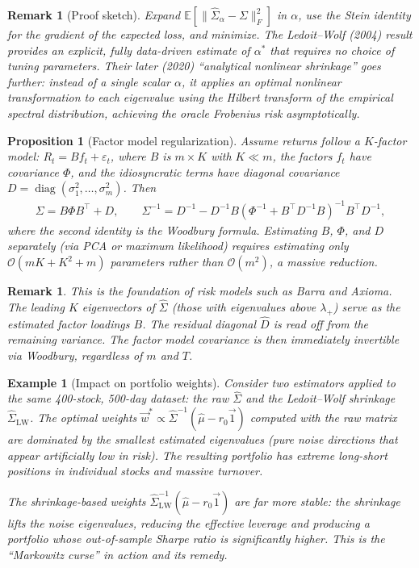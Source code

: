 \documentclass{report}
\theoremstyle{spacedplain}
\newtheorem{proposition}[theorem]{Proposition}
\theoremstyle{spaceddefinition}
\newtheorem{example}[theorem]{Example}
\theoremstyle{spacedremark}
\newtheorem{remark}[theorem]{Remark}
\begin{document}
\begin{remark}[Proof sketch]
Expand $\mathbb{E}[\|\hat{\Sigma}_\alpha - \Sigma\|_F^2]$ in $\alpha$, use the Stein identity for the gradient of the expected loss, and minimize. The Ledoit--Wolf (2004) result provides an explicit, fully data-driven estimate of
$\alpha^*$ that requires no choice of tuning parameters. Their later (2020) ``analytical nonlinear shrinkage'' goes further: instead of a single scalar $\alpha$, it applies an optimal nonlinear transformation to each eigenvalue
using the Hilbert transform of the empirical spectral distribution, achieving the oracle Frobenius risk asymptotically.
\end{remark}
 
\begin{proposition}[Factor model regularization]
Assume returns follow a $K$-factor model: $R_t = Bf_t + \varepsilon_t$, where $B$ is $m\times K$ with $K \ll m$, the factors $f_t$ have covariance $\Phi$, and the idiosyncratic terms have diagonal covariance $D = \operatorname{diag}(\sigma_1^2,\ldots,\sigma_m^2)$. Then
\begin{align}
    \Sigma = B\Phi B^\top + D,
    \qquad
    \Sigma^{-1} = D^{-1} - D^{-1}B(\Phi^{-1} + B^\top D^{-1}B)^{-1}B^\top D^{-1},
\end{align}
where the second identity is the Woodbury formula. Estimating $B$, $\Phi$, and $D$ separately (via PCA or maximum likelihood) requires estimating only $\mathcal{O}(mK + K^2 + m)$ parameters rather than $\mathcal{O}(m^2)$, a massive reduction.
\end{proposition}
 
\begin{remark}
This is the foundation of risk models such as Barra and Axioma. The leading $K$ eigenvectors of $\hat{\Sigma}$ (those with eigenvalues above $\lambda_+$) serve as the estimated factor loadings $B$. The residual diagonal $\hat{D}$ is read
off from the remaining variance. The factor model covariance is then immediately invertible via Woodbury, regardless of $m$ and $T$.
\end{remark}
 
\begin{example}[Impact on portfolio weights]
Consider two estimators applied to the same 400-stock, 500-day dataset: the raw $\hat{\Sigma}$ and the Ledoit--Wolf shrinkage $\hat{\Sigma}_{\mathrm{LW}}$. The optimal weights $\vec{w}^* \propto \hat{\Sigma}^{-1}(\hat{\mu} - r_0\vec{1})$
computed with the raw matrix are dominated by the smallest estimated eigenvalues (pure noise directions that appear artificially low in risk). The resulting portfolio has extreme long-short positions in individual stocks and
massive turnover.
 
The shrinkage-based weights $\hat{\Sigma}_{\mathrm{LW}}^{-1}(\hat{\mu} - r_0\vec{1})$ are far more stable: the shrinkage lifts the noise eigenvalues, reducing the effective leverage and producing a portfolio whose out-of-sample Sharpe ratio is significantly higher. This is the ``Markowitz curse'' in action and its remedy.
\end{example}
 
\end{document}
